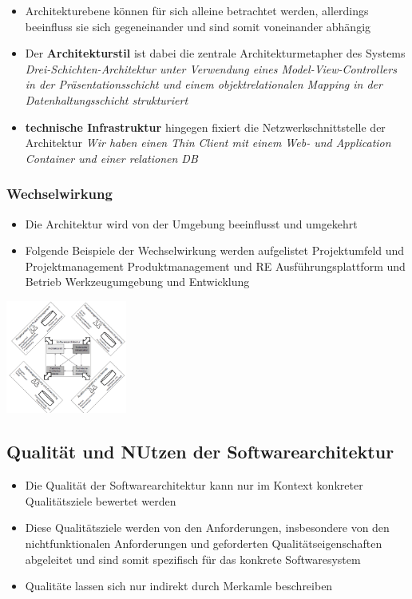 \documentclass{report}
\newenvironment{Figure}
	{\par\medskip\noindent\minipage{\linewidth}}
	{\endminipage\par\medskip}
\theoremstyle{definition}
\theoremstyle{example}
\begin{document}
\begin{itemize}
   \item Architekturebene können für sich alleine betrachtet werden, allerdings beeinfluss sie sich gegeneinander und sind somit voneinander abhängig
   \item Der \textbf{Architekturstil} ist dabei die zentrale Architekturmetapher des Systems 
   \subitem \textit{Drei-Schichten-Architektur unter Verwendung eines Model-View-Controllers in der Präsentationsschicht und einem objektrelationalen Mapping in der Datenhaltungsschicht strukturiert}
   \item \textbf{technische Infrastruktur} hingegen fixiert die Netzwerkschnittstelle der Architektur
   \subitem \textit{Wir haben einen Thin Client mit einem Web- und Application Container und einer relationen DB} 
\end{itemize}

\subsubsection{Wechselwirkung}
\begin{itemize}
   \item Die Architektur wird von der Umgebung beeinflusst und umgekehrt
   \item Folgende Beispiele der Wechselwirkung werden aufgelistet
   \subitem Projektumfeld und Projektmanagement
   \subitem Produktmanagement und RE
   \subitem Ausführungsplattform und Betrieb
   \subitem Werkzeugumgebung und Entwicklung 
\end{itemize}

\begin{Figure}
   \centering
    \includegraphics[width=150px]{img/Wechselwirkung.png}
        \label{fig:Abbildung des Gesamtbildes}
\end{Figure}

\subsection{Qualität und NUtzen der Softwarearchitektur}
\begin{itemize}
   \item Die Qualität der Softwarearchitektur kann nur im Kontext konkreter Qualitätsziele bewertet werden
   \item Diese Qualitätsziele werden von den Anforderungen, insbesondere von den nichtfunktionalen Anforderungen und geforderten Qualitätseigenschaften abgeleitet und sind somit spezifisch für das konkrete Softwaresystem
   \item Qualitäte lassen sich nur indirekt durch Merkamle beschreiben
\end{itemize}
\end{document}
